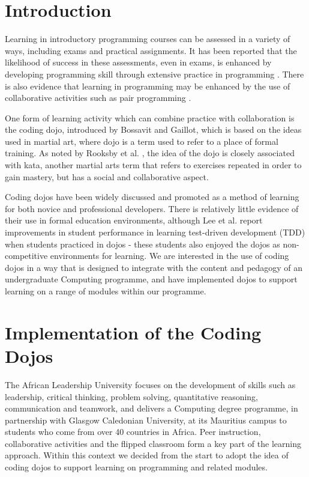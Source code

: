 \section{Introduction}

Learning in introductory programming courses can be assessed in a variety of ways, including exams and practical assignments. It has been reported that the likelihood of success in these assessments, even in exams, is enhanced by developing programming skill through extensive practice in programming \cite{hassinen2006learning}. There is also evidence that learning in programming may be enhanced by the use of collaborative activities such as pair programming \cite{hanks2011pair}. 

One form of learning activity which can combine practice with collaboration is the coding dojo, introduced by Bossavit and Gaillot\cite{bossavit2005coder}, which is based on the ideas used in martial art, where dojo is a term used to refer to a place of formal training.  As noted by Rooksby et al. \cite{rooksby2014theory}, the idea of the dojo is closely associated with kata, another martial arts term that refers to exercises repeated in order to gain mastery, but has a social and collaborative aspect. 

Coding dojos have been widely discussed and promoted as a method of learning for both novice and professional developers. There is relatively little evidence of their use in formal education environments, although Lee et al.\cite{lee2017teaching} report improvements in student performance in learning test-driven development (TDD) when students practiced in dojos - these students also enjoyed the dojos as non-competitive environments for learning. We are interested in the use of coding dojos in a way that is designed to integrate with the content and pedagogy of an undergraduate Computing programme, and have implemented dojos to support learning on a range of modules within our programme.

\section{Implementation of the Coding Dojos}
The African Leadership University focuses on the development of skills such as leadership, critical thinking, problem solving, quantitative reasoning, communication and teamwork, and delivers a Computing degree programme, in partnership with Glasgow Caledonian University, at its Mauritius campus to students who come from over 40 countries in Africa. Peer instruction, collaborative activities and the flipped classroom form a key part of the learning approach. Within this context we decided from the start to adopt the idea of coding dojos to support learning on programming and related modules.
